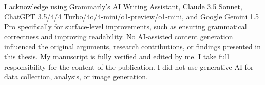 
I acknowledge using Grammarly's AI Writing Assistant, Claude 3.5 Sonnet, ChatGPT 3.5/4/4 Turbo/4o/4-mini/o1-preview/o1-mini, and Google Gemini 1.5 Pro specifically for surface-level improvements, such as ensuring grammatical correctness and improving readability. No AI-assisted content generation influenced the original arguments, research contributions, or findings presented in this thesis. My manuscript is fully verified and edited by me. I take full responsibility for the content of the publication. I did not use generative AI for data collection, analysis, or image generation.